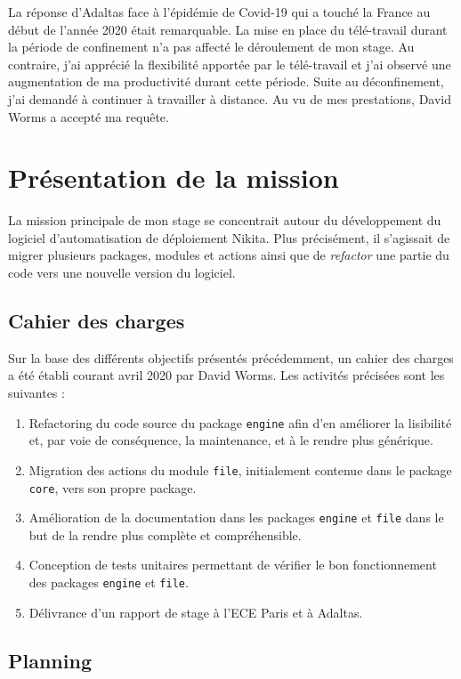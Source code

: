 \documentclass[12pt, french]{report}
\begin{document}
La réponse d'Adaltas face à l'épidémie de Covid-19 qui a touché la France au début de l'année 2020 était remarquable. La mise en place du télé-travail durant la période de confinement n'a pas affecté le déroulement de mon stage. Au contraire, j'ai apprécié la flexibilité apportée par le télé-travail et j'ai observé une augmentation de ma productivité durant cette période. Suite au déconfinement, j'ai demandé à continuer à travailler à distance. Au vu de mes prestations, David Worms a accepté ma requête.

\chapter{Présentation de la mission}

La mission principale de mon stage se concentrait autour du développement du logiciel d'automatisation de déploiement Nikita. Plus précisément, il s'agissait de migrer plusieurs packages, modules et actions ainsi que de \textit{refactor} une partie du code vers une nouvelle version du logiciel.

\section{Cahier des charges}

Sur la base des différents objectifs présentés précédemment, un cahier des charges a été établi courant avril 2020 par David Worms. Les activités précisées sont les suivantes : 

\begin{enumerate}
  \item Refactoring du code source du package \texttt{engine} afin d'en améliorer la lisibilité et, par voie de conséquence, la maintenance, et à le rendre plus générique.
  \item Migration des actions du module \texttt{file}, initialement contenue dans le package \texttt{core}, vers son propre package.
  \item Amélioration de la documentation dans les packages \texttt{engine} et \texttt{file} dans le but de la rendre plus complète et compréhensible.
  \item Conception de tests unitaires permettant de vérifier le bon fonctionnement des packages \texttt{engine} et \texttt{file}.
  \item Délivrance d'un rapport de stage à l'ECE Paris et à Adaltas.
\end{enumerate}

\section{Planning}
\end{document}
